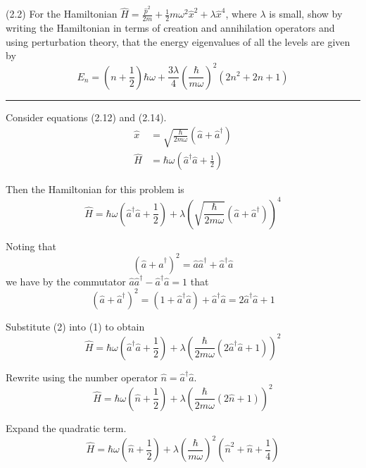 \documentclass[12pt]{article}
\begin{document}
(2.2)
For the Hamiltonian
$\hat H=\frac{\hat p^2}{2m}+\frac{1}{2}m\omega^2\hat x^2+\lambda\hat x^4$,
where $\lambda$ is small, show by writing the Hamiltonian
in terms of creation and annihilation operators and
using perturbation theory, that the energy eigenvalues
of all the levels are given by
\begin{equation*}
E_n=\left(n+\frac{1}{2}\right)\hbar\omega
+\frac{3\lambda}{4}\left(\frac{\hbar}{m\omega}\right)^2
\left(2n^2+2n+1\right)
\tag{2.67}
\end{equation*}

\bigskip
\hrule

\bigskip
Consider equations (2.12) and (2.14).
\begin{align*}
\hat x&=\sqrt{\frac{\hbar}{2m\omega}}\left(\hat a+\hat a^\dag\right)
\tag{2.12}
\\
\hat H&=\hbar\omega\left(\hat a^\dag\hat a+\frac{1}{2}\right)
\tag{2.14}
\end{align*}

Then the Hamiltonian for this problem is
\begin{equation*}
\hat H=\hbar\omega\left(\hat a^\dag\hat a+\frac{1}{2}\right)
+\lambda\left(\sqrt{\frac{\hbar}{2m\omega}}\left(\hat a+\hat a^\dag\right)\right)^4
\tag{1}
\end{equation*}

Noting that
\begin{equation*}
\left(\hat a+\hat a^\dag\right)^2
=\hat a\hat a^\dag+\hat a^\dag\hat a
\end{equation*}
we have by the commutator $\hat a\hat a^\dag-\hat a^\dag\hat a=1$ that
\begin{equation*}
\left(\hat a+\hat a^\dag\right)^2
=(1+\hat a^\dag\hat a)+\hat a^\dag\hat a=2\hat a^\dag\hat a+1
\tag{2}
\end{equation*}

Substitute (2) into (1) to obtain
\begin{equation*}
\hat H=\hbar\omega\left(\hat a^\dag\hat a+\frac{1}{2}\right)
+\lambda\left(\frac{\hbar}{2m\omega}\left(2\hat a^\dag\hat a+1\right)\right)^2
\end{equation*}

Rewrite using the number operator $\hat n=\hat a^\dag\hat a$.
\begin{equation*}
\hat H=\hbar\omega\left(\hat n+\frac{1}{2}\right)
+\lambda\left(\frac{\hbar}{2m\omega}\left(2\hat n+1\right)\right)^2
\end{equation*}

Expand the quadratic term.
\begin{equation*}
\hat H=\hbar\omega\left(\hat n+\frac{1}{2}\right)
+\lambda\left(\frac{\hbar}{m\omega}\right)^2\left(\hat n^2+\hat n+\frac{1}{4}\right)
\end{equation*}
\end{document}
